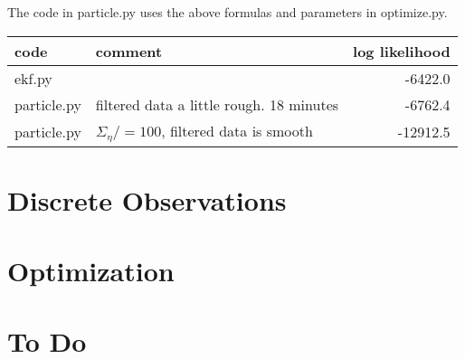 \documentclass[12pt]{article}
\begin{document}
The code in particle.py uses the above formulas and parameters in
optimize.py.

\begin{tabular}[t]{l|l|r}
  code&comment&log likelihood \\ \hline
  ekf.py & & -6422.0 \\
  particle.py & filtered data a little rough. 18 minutes &
                                                               -6762.4 \\
  particle.py & $\Sigma_\eta /= 100$, filtered data is smooth &
                                                               -12912.5 \\
\end{tabular}

\section{Discrete Observations}
\label{sec:DiscreteObservations}

\section{Optimization}
\label{sec:Optimization}

\section{To Do}
\label{sec:ToDo}
\end{document}

